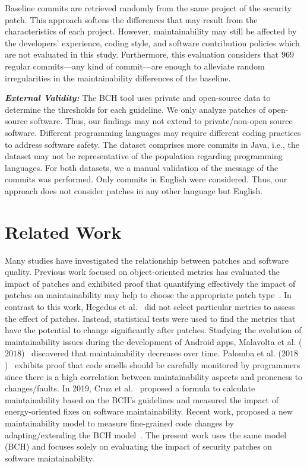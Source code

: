 \documentclass[smallextended]{svjour3}       %
\begin{document}
Baseline commits are retrieved randomly from 
the same project of the security patch.
This approach softens the differences
that may result from the characteristics of each project. However,
maintainability may still be affected by the developers' experience, coding
style, and software contribution policies which are not evaluated in this study.
Furthermore, this evaluation considers that $969$ regular commits---any kind
of commit---are enough to
alleviate random irregularities in the maintainability differences of the
baseline. 
%

\textit{\textbf{External Validity:}} The BCH tool uses private and open-source data to determine the thresholds for each guideline. We only analyze patches of open-source software.
Thus, our findings may not extend to private/non-open source software. Different programming 
languages may require different coding practices to address software safety. The 
dataset comprises more commits in Java, i.e., the dataset may not be representative 
of the population regarding programming languages. For both datasets, we a manual validation of the message of the commits was performed. Only commits in English were considered. Thus, our approach does not consider 
patches in any other language but English.

\section{Related Work}\label{sec:rw}

Many studies have investigated the relationship between patches and
software quality. Previous work focused on object-oriented metrics has evaluated the
impact of patches and exhibited proof that quantifying effectively the
impact of patches on maintainability may help to choose the appropriate
patch type~\cite{1167822}. In contrast to this work, Hegedus et
al.~\cite{HEGEDUS2018313} did not select particular metrics to assess the effect
of patches. Instead, statistical tests were used to find the metrics that
have the potential to change significantly after patches. Studying the evolution 
of maintainability issues during the development of Android apps, Malavolta et al. ($2018$)~\cite{8530041}
discovered that maintainability decreases over time. Palomba et al.
($2018$)~\cite{Palomba:2018:DIM:3231288.3231337} exhibits proof that code smells
should be carefully monitored by programmers since there is a high correlation
between maintainability aspects and proneness to changes/faults. In 2019, Cruz et 
al.~\cite{8919169} proposed a formula to calculate maintainability 
based on the BCH's guidelines and measured the impact of energy-oriented fixes 
on software maintainability. Recent work,
proposed a new maintainability model to 
measure fine-grained code changes by adapting/extending the BCH model~\cite{8785997}.
The present work uses the same model (BCH) and focuses 
solely on evaluating the impact of security patches on software maintainability.
\end{document}
